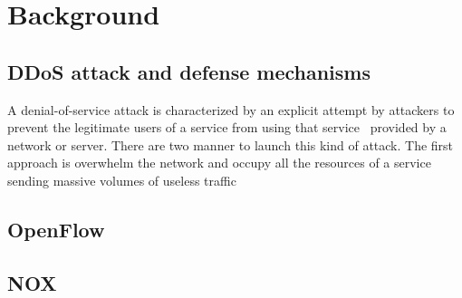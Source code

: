 \chapter{Background}
\label{chapter:background} 



\section{DDoS attack and defense mechanisms}

A denial-of-service attack is characterized by an explicit attempt by attackers to prevent the legitimate users of a service from using that service~\cite{dosCert} provided by a network or server. There are two manner to launch this kind of attack. The first approach is overwhelm the network and occupy all the resources of a service sending massive volumes of useless traffic

\section{OpenFlow}



\section{NOX}
